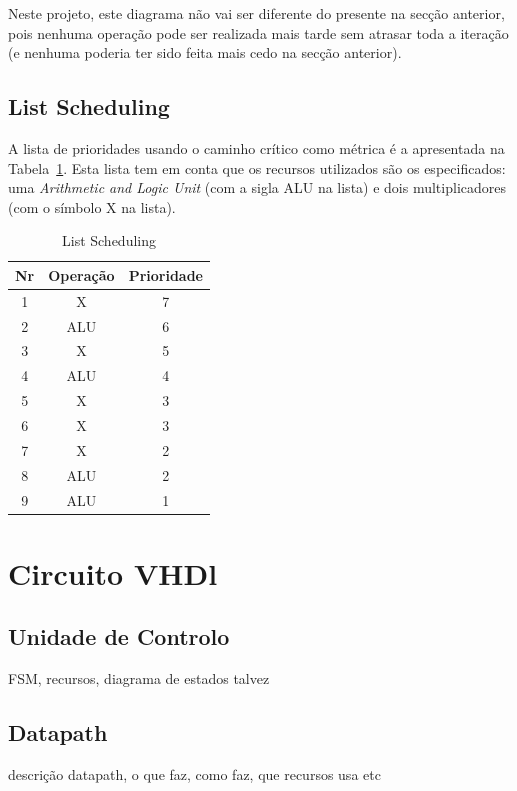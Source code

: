 \documentclass{article} %
\begin{document}
			\noindent Neste projeto, este diagrama não vai ser diferente do presente na secção anterior, pois nenhuma operação pode ser realizada mais tarde sem atrasar toda a iteração (e nenhuma poderia ter sido feita mais cedo na secção anterior).

		\subsection{List Scheduling}
		
		A lista de prioridades usando o caminho crítico como métrica é a apresentada na Tabela~\ref{tab:Lsched}. Esta lista tem em conta que os recursos utilizados são os especificados: uma \emph{Arithmetic and Logic Unit} (com a sigla ALU na lista) e dois multiplicadores (com o símbolo X na lista).

		\begin{table}[htbp]
			\caption{List Scheduling}
			\begin{center}
				\begin{tabular}{|c||c||c|}
					\hline
					Nr & Operação & Prioridade \\
					\hline
					1 & X & 7 \\
					\hline
					2 & ALU & 6 \\
					\hline
					3 & X & 5 \\
					\hline
					4 & ALU & 4 \\
					\hline
					5 & X & 3 \\
					\hline
					6 & X & 3 \\
					\hline
					7 & X & 2 \\
					\hline
					8 & ALU & 2 \\
					\hline
					9 & ALU & 1 \\
					\hline
				\end{tabular}
			\end{center}
			\label{tab:Lsched}
		\end{table}

	\section{Circuito VHDl}
		\subsection{Unidade de Controlo}
			FSM, recursos, diagrama de estados talvez

		\subsection{Datapath}
			descrição datapath, o que faz, como faz, que recursos usa etc
\end{document}

